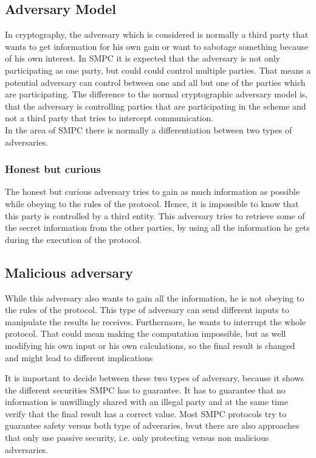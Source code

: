 \documentclass[english,runningheads,a4paper]{llncs}[2018/03/10]
\begin{document}
\subsection{Adversary Model}
In cryptography, the adversary which is considered is normally a third party that wants to get information for his own gain or want to sabotage something because of his own interest. In SMPC it is expected that the adversary is not only participating as one party, but could could control multiple parties. That means a potential adversary can control between one and all but one of the parties which are participating. The difference to the normal cryptographic adversary model is, that the adversary is controlling parties that are participating in the scheme and not a third party that tries to intercept communication.\\
In the area of SMPC there is normally a differentiation between two types of adversaries.

\subsubsection{Honest but curious}
The honest but curious adversary tries to gain as much information as possible while obeying to the rules of the protocol. Hence, it is impossible to know that this party is controlled by a third entity. This adversary tries to retrieve some of the secret information from the other parties, by using all the information he gets during the execution of the protocol.

\subsection{Malicious adversary}
While this adversary also wants to gain all the information, he is not obeying to the rules of the protocol. This type of adversary can send different inputs to manipulate the results he receives. Furthermore, he wants to interrupt the whole protocol. That could mean making the computation impossible, but as well modifying his own input or his own calculations, so the final result is changed and might lead to different implications

It is important to decide between these two types of adversary, because it shows the different securities SMPC has to guarantee. It has to guarantee that no information is unwillingly shared with an illegal party and at the same time verify that the final result has a correct value. Most SMPC protocols try to guarantee safety versus both type of adveraries, bvut there are also approaches that only use passive security, i.e. only protecting versus non malicious adversaries.
\end{document}
